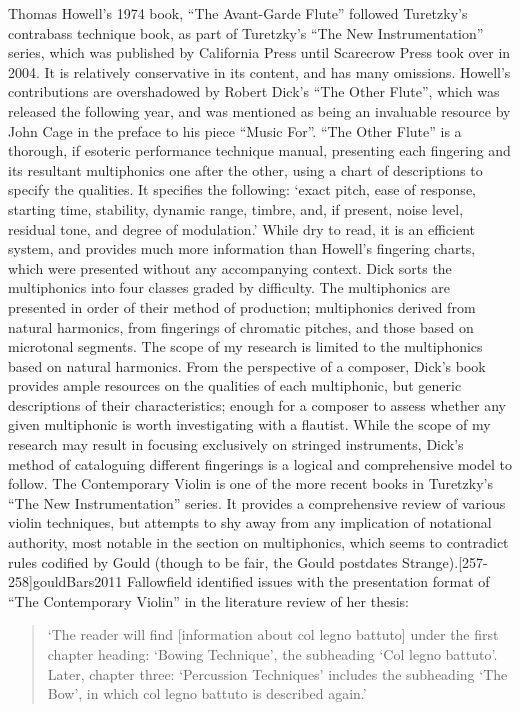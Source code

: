Thomas Howell’s 1974 book, “The Avant-Garde Flute” followed Turetzky’s contrabass technique book, as part of Turetzky’s “The New Instrumentation” series, which was published by California Press until Scarecrow Press took over in 2004.\autocite[4]{fallowfieldCelloMapHandbook2009}  It is relatively conservative in its content, and has many omissions. Howell’s contributions are overshadowed by Robert Dick’s “The Other Flute”, which was released the following year, and was mentioned as being an invaluable resource by John Cage in the preface to his piece “Music For”.\autocite{cageMusicPartsVoice1984}  “The Other Flute” is a thorough, if esoteric performance technique manual, presenting each fingering and its resultant multiphonics one after the other, using a chart of descriptions to specify the qualities. It specifies the following: ‘exact pitch, ease of response, starting time, stability, dynamic range, timbre, and, if present, noise level, residual tone, and degree of modulation.’\autocite[84]{dickOtherFlute1989}  While dry to read, it is an efficient system, and provides much more information than Howell’s fingering charts, which were presented without any accompanying context. Dick sorts the multiphonics into four classes graded by difficulty. The multiphonics are presented in order of their method of production; multiphonics derived from natural harmonics, from fingerings of chromatic pitches, and those based on microtonal segments. The scope of my research is limited to the multiphonics based on natural harmonics. From the perspective of a composer, Dick’s book provides ample resources on the qualities of each multiphonic, but generic descriptions of their characteristics; enough for a composer to assess whether any given multiphonic is worth investigating with a flautist. While the scope of my research may result in focusing exclusively on stringed instruments, Dick’s method of cataloguing different fingerings is a logical and comprehensive model to follow.
The Contemporary Violin is one of the more recent books in Turetzky’s “The New Instrumentation” series. It provides a comprehensive review of various violin techniques, but attempts to shy away from any implication of notational authority, most notable in the section on multiphonics, which seems to contradict rules codified by Gould (though to be fair, the Gould postdates Strange).\autocite[134]{strangeContemporaryViolinExtended2001}[257-258]{gouldBars2011} Fallowfield identified issues with the presentation format of “The Contemporary Violin” in the literature review of her thesis: 
\begin{quotation}
    ‘The reader will find [information about col legno battuto] under the first chapter heading: ‘Bowing Technique’, the subheading ‘Col legno battuto’. Later, chapter three: ‘Percussion Techniques’ includes the subheading ‘The Bow’, in which col legno battuto is described again.’\autocite[12]{fallowfieldCelloMapHandbook2009}
\end{quotation}

